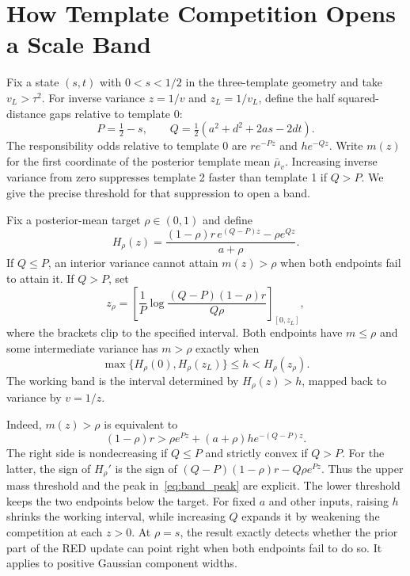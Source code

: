 \section{How Template Competition Opens a Scale Band}\label{sec:geometry}
Fix a state $(s,t)$ with $0<s<1/2$ in the three-template geometry
and take $v_L>\tau^2$.
For inverse variance $z=1/v$ and $z_L=1/v_L$, define the half squared-distance
gaps relative to template 0:
\begin{equation}\label{eq:band_gaps}
 P=\tfrac12-s,\qquad Q=\tfrac12(a^2+d^2+2as-2dt).
\end{equation}
The responsibility odds relative to template 0 are $r e^{-Pz}$ and
$h e^{-Qz}$. Write $m(z)$ for the first coordinate of the posterior
template mean $\bar\mu_v$. Increasing inverse variance from zero suppresses template 2 faster than template 1 if $Q>P$.
We give the precise threshold for that suppression to open a band.

\begin{proposition}\label{prop:mass_band}
Fix a posterior-mean target $\rho\in(0,1)$ and define
\begin{equation}\label{eq:mass_capacity}
 H_\rho(z)=
 \frac{(1-\rho)r\,e^{(Q-P)z}-\rho e^{Qz}}{a+\rho}.
\end{equation}
If $Q\le P$, an interior variance cannot attain $m(z)>\rho$ when
both endpoints fail to attain it. If $Q>P$, set
\begin{equation}\label{eq:band_peak}
 z_\rho=\left[\frac{1}{P}
     \log\frac{(Q-P)(1-\rho)r}{Q\rho}\right]_{[0,z_L]},
\end{equation}
where the brackets clip to the specified interval.
Both endpoints have $m\le\rho$ and some intermediate variance has
$m>\rho$ exactly when
\begin{equation}\label{eq:exact_mass_window}
 \max\{H_\rho(0),H_\rho(z_L)\}\le h < H_\rho(z_\rho).
\end{equation}
The working band is the interval determined by $H_\rho(z)>h$, mapped
back to variance by $v=1/z$.
\end{proposition}

Indeed, $m(z)>\rho$ is equivalent to
\[
 (1-\rho)r>\rho e^{Pz}+(a+\rho)h e^{-(Q-P)z}.
\]
The right side is nondecreasing if $Q\le P$ and strictly convex if
$Q>P$. For the latter, the sign of $H_\rho'$ is the sign of
$(Q-P)(1-\rho)r-Q\rho e^{Pz}$. Thus the upper mass threshold
and the peak in~\eqref{eq:band_peak} are explicit. The lower threshold
keeps the two endpoints below the target. For fixed $a$ and other
inputs, raising $h$ shrinks the working interval, while increasing
$Q$ expands it by weakening the competition at each $z>0$.
At $\rho=s$, the result exactly detects whether the prior part
of the RED update can point right when both endpoints fail to do so.
It applies to positive Gaussian component widths.

